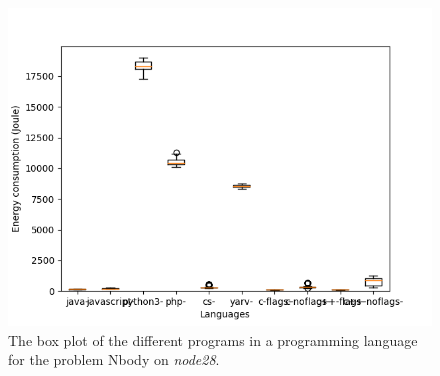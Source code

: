 \begin{appendices}
\begin{figure}[h]
    \centering
    \includegraphics[width=.6\textwidth]{graphs/nbody_BOXoverview3.png}
    \caption{The box plot of the different programs in a programming language for the problem Nbody on \textit{node28}.}
    \label{fig:box-nbody3}
\end{figure}

\begin{table}[h]
\centering
{}
\caption{The comparison of the different languages for the Nbody problem on \textit{node28}. A \textit{+} means that the language on the row has a lower energy consumption then the language on the column, the opposite for \textit{-}, and the \textit{Unknown} means that we could not reject the null hypothesis.}
\label{tab:lang-nbody3}
\end{table}


\end{appendices}

